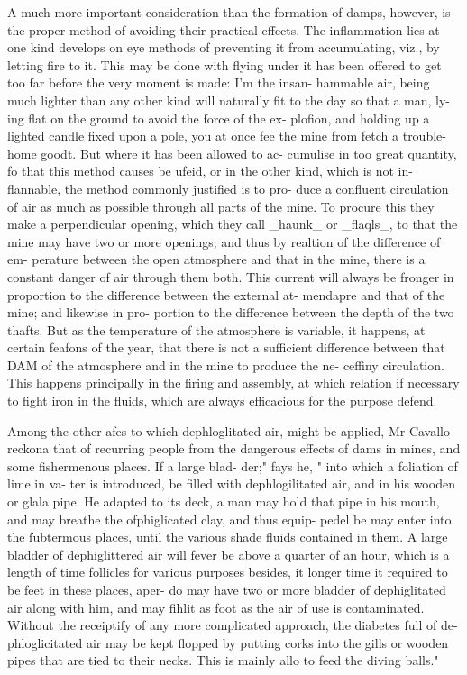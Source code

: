 \documentclass{article}
\begin{document}
A much more important consideration than the formation of damps, however, is the proper method of avoiding their practical effects. The inflammation lies at one kind develops on eye methods of preventing it from accumulating, viz., by letting fire to it. This may be done with flying under it has been offered to get too far before the very moment is made: I’m the insan- hammable air, being much lighter than any other kind will naturally fit to the day so that a man, ly- ing flat on the ground to avoid the force of the ex- plofion, and holding up a lighted candle fixed upon a pole, you at once fee the mine from fetch a trouble- home goodt. But where it has been allowed to ac- cumulise in too great quantity, fo that this method causes be ufeid, or in the other kind, which is not in- flannable, the method commonly justified is to pro- duce a confluent circulation of air as much as possible through all parts of the mine. To procure this they make a perpendicular opening, which they call \_haunk\_ or \_flaqls\_, to that the mine may have two or more openings; and thus by realtion of the difference of em- perature between the open atmosphere and that in the mine, there is a constant danger of air through them both. This current will always be fronger in proportion to the difference between the external at- mendapre and that of the mine; and likewise in pro- portion to the difference between the depth of the two thafts. But as the temperature of the atmosphere is variable, it happens, at certain feafons of the year, that there is not a sufficient difference between that DAM of the atmosphere and in the mine to produce the ne- ceffiny circulation. This happens principally in the firing and assembly, at which relation if necessary to fight iron in the fluids, which are always efficacious for the purpose defend.

Among the other afes to which dephloglitated air, might be applied, Mr Cavallo reckona that of recurring people from the dangerous effects of dams in mines, and some fishermenous places. If a large blad- der;" fays he, " into which a foliation of lime in va- ter is introduced, be filled with dephlogilitated air, and in his wooden or glala pipe. He adapted to its deck, a man may hold that pipe in his mouth, and may breathe the ofphiglicated clay, and thus equip- pedel be may enter into the fubtermous places, until the various shade fluids contained in them. A large bladder of dephiglittered air will fever be above a quarter of an hour, which is a length of time follicles for various purposes besides, it longer time it required to be feet in these places, aper- do may have two or more bladder of dephiglitated air along with him, and may fihlit as foot as the air of use is contaminated. Without the receiptify of any more complicated approach, the diabetes full of de- phloglicitated air may be kept flopped by putting corks into the gills or wooden pipes that are tied to their necks. This is mainly allo to feed the diving balls."
\end{document}
